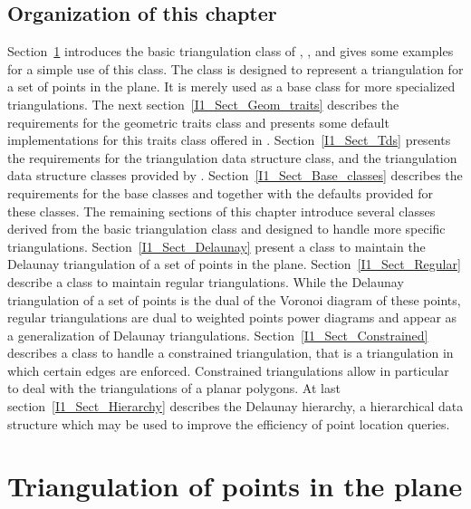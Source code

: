 \subsection*{Organization of this chapter}
Section~\ref{I1_Sect_Triangulation_2} introduces the basic triangulation class of \cgal ,
 ,  and gives some examples for a simple use of this class.
 The  class  is designed to represent 
a triangulation for a set of points in the plane. It is merely used
as a base class for more specialized triangulations.
The next section~\ref{I1_Sect_Geom_traits}
describes the requirements for the geometric
traits class and presents some default implementations
for this traits class offered in \cgal. 
Section~\ref{I1_Sect_Tds}  presents the requirements for the 
{triangulation data structure} class,
 and the {triangulation data structure} classes
provided by \cgal. 
Section~\ref{I1_Sect_Base_classes} describes the requirements
for the base classes  and   
together with the defaults provided for these classes.
The remaining sections of this chapter introduce
several classes derived from the basic triangulation class
and designed to handle more specific triangulations.
Section~\ref{I1_Sect_Delaunay} present a class to 
maintain the Delaunay triangulation of a set of points in the plane.
 Section~\ref{I1_Sect_Regular}
describe a class to maintain regular triangulations.
While the Delaunay triangulation of a set of points
is the dual of the Voronoi
diagram of these points,
 regular triangulations are dual to weighted points power diagrams
and  appear as a generalization of
Delaunay triangulations. Section~\ref{I1_Sect_Constrained} 
describes a class to handle a constrained triangulation,
that is a triangulation in which certain edges are enforced.
Constrained triangulations allow in particular to deal with the 
triangulations of a planar polygons.
At last section~\ref{I1_Sect_Hierarchy} describes the
Delaunay hierarchy, a hierarchical data
structure which may be used to improve the efficiency
of point location queries.

 

\section{Triangulation of points in the plane }
\label{I1_Sect_Triangulation_2}

